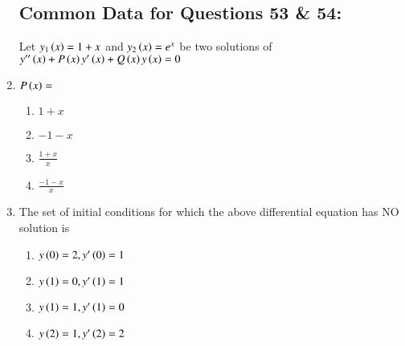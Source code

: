 \documentclass[journal]{IEEEtran}
\begin{document}
\begin{enumerate}
\subsection*{Common Data for Questions 53 \& 54:}
Let $y_1\left(x\right) = 1+x$ and $y_2\left(x\right) = e^x$ be two solutions of $y^{{\prime}{\prime}}\left(x\right) + P\left(x\right)y^{\prime}\left(x\right) + Q\left(x\right) y\left(x\right) = 0$
\item $P\left(x\right) = $
\begin{multicols}{2}
    \begin{enumerate}
        \item $1+x$
        \item $-1-x$
        \item $\frac{1+x}{x}$
        \item $\frac{-1-x}{x}$
    \end{enumerate}
\end{multicols}
\item The set of initial conditions for which the above differential equation has NO solution is
\begin{multicols}{2}
    \begin{enumerate}
        \item $y\left(0\right) = 2, y^{\prime}\left(0\right) = 1$
        \item $y\left(1\right) = 0, y^{\prime}\left(1\right) = 1$
        \item $y\left(1\right) = 1, y^{\prime}\left(1\right) = 0$
        \item $y\left(2\right) = 1, y^{\prime}\left(2\right) = 2$
    \end{enumerate}
\end{multicols}


\end{enumerate}
\end{document}
